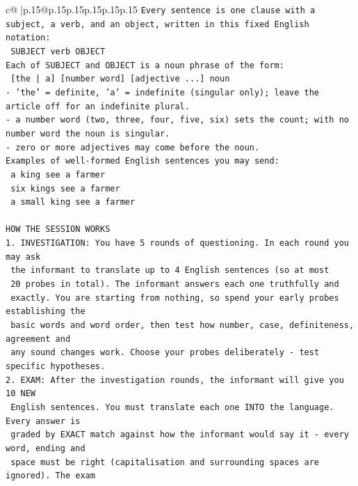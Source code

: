 \documentclass{article}
\begin{document}
{\begin{supertabular}{c@{$\;$}|p{.15\linewidth}@{}p{.15\linewidth}p{.15\linewidth}p{.15\linewidth}p{.15\linewidth}p{.15\linewidth}}
{{{\texttt{Every sentence is one clause with a subject, a verb, and an object, written in this fixed English notation:} \\
\texttt{    SUBJECT  verb  OBJECT} \\
\texttt{Each of SUBJECT and OBJECT is a noun phrase of the form:} \\
\texttt{    {[}the | a{]}  {[}number word{]}  {[}adjective ...{]}  noun} \\
\texttt{{-} 'the' = definite, 'a' = indefinite (singular only); leave the article off for an indefinite plural.} \\
\texttt{{-} a number word (two, three, four, five, six) sets the count; with no number word the noun is singular.} \\
\texttt{{-} zero or more adjectives may come before the noun.} \\
\texttt{Examples of well{-}formed English sentences you may send:} \\
\texttt{    a king see a farmer} \\
\texttt{    six kings see a farmer} \\
\texttt{    a small king see a farmer} \\
\\ 
\texttt{HOW THE SESSION WORKS} \\
\texttt{1. INVESTIGATION: You have 5 rounds of questioning. In each round you may ask} \\
\texttt{   the informant to translate up to 4 English sentences (so at most} \\
\texttt{   20 probes in total). The informant answers each one truthfully and} \\
\texttt{   exactly. You are starting from nothing, so spend your early probes establishing the} \\
\texttt{   basic words and word order, then test how number, case, definiteness, agreement and} \\
\texttt{   any sound changes work. Choose your probes deliberately {-} test specific hypotheses.} \\
\texttt{2. EXAM: After the investigation rounds, the informant will give you 10 NEW} \\
\texttt{   English sentences. You must translate each one INTO the language. Every answer is} \\
\texttt{   graded by EXACT match against how the informant would say it {-} every word, ending and} \\
\texttt{   space must be right (capitalisation and surrounding spaces are ignored). The exam} \\
}}}
\end{supertabular}}
\end{document}
